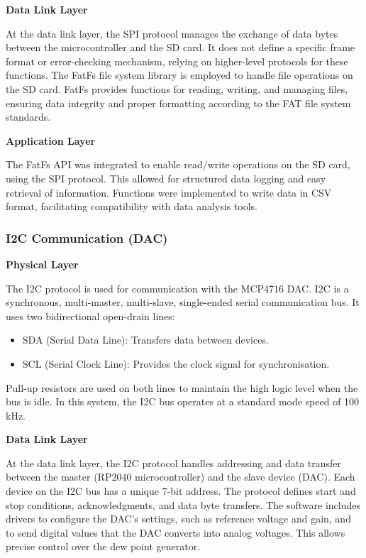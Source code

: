 \textbf{Data Link Layer}

At the data link layer, the SPI protocol manages the exchange of data bytes between the microcontroller 
and the SD card. It does not define a specific frame format or error-checking mechanism, relying on 
higher-level protocols for these functions. The FatFs file system library is employed to handle file 
operations on the SD card. FatFs provides functions for reading, writing, and managing files, ensuring 
data integrity and proper formatting according to the FAT file system standards.

\textbf{Application Layer}

The FatFs API was integrated to enable read/write operations on the SD card, 
using the SPI protocol. This allowed for structured data logging and easy retrieval of information. 
Functions were implemented to write data in CSV format, facilitating compatibility with data analysis tools.

\subsubsection{I2C Communication (DAC)}

\textbf{Physical Layer}

The I2C protocol is used for communication with the MCP4716 DAC. I2C is a synchronous, multi-master, 
multi-slave, single-ended serial communication bus. It uses two bidirectional open-drain lines:
\begin{itemize}
    \item SDA (Serial Data Line): Transfers data between devices.
    \item SCL (Serial Clock Line): Provides the clock signal for synchronisation.
\end{itemize}
Pull-up resistors are used on both lines to maintain the high logic level when the bus is idle. 
In this system, the I2C bus operates at a standard mode speed of 100 kHz.

\textbf{Data Link Layer}

At the data link layer, the I2C protocol handles addressing and data transfer between the master 
(RP2040 microcontroller) and the slave device (DAC). Each device on the I2C bus has a unique 7-bit address. 
The protocol defines start and stop conditions, acknowledgments, and data byte transfers. The software includes drivers to configure the DAC's settings, such as reference voltage and gain, and to send digital values that the DAC converts into analog voltages. This allows precise control over the dew point generator.

